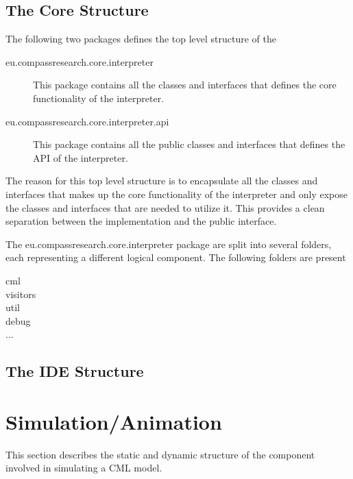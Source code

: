 \documentclass[a4paper, 12pt]{include/compassreport}   %
\begin{document}
\subsection{The Core Structure}

The following two packages defines the top level
structure of the 

\begin{description}
\item[eu.compassresearch.core.interpreter] This package contains all
the classes and interfaces that defines the core functionality of the
interpreter.
\item[eu.compassresearch.core.interpreter.api] This package contains
all the public classes and interfaces that defines the API of the
interpreter. 
\end{description}

The reason for this top level structure is to encapsulate all the
classes and interfaces that makes up the core functionality of the
interpreter and only expose the classes and interfaces that are needed
to utilize it. This provides a clean separation between the
implementation and the public interface.

The eu.compassresearch.core.interpreter package are split into several
folders, each representing a different logical component. The
following folders are present

\begin{description}
\item[cml] 
\item[visitors]
\item[util]
\item[debug]
\item[...]
\end{description}

\subsection{The IDE Structure}


\section{Simulation/Animation}
This section describes the static and dynamic structure of the
component involved in simulating a CML model.
\end{document}
